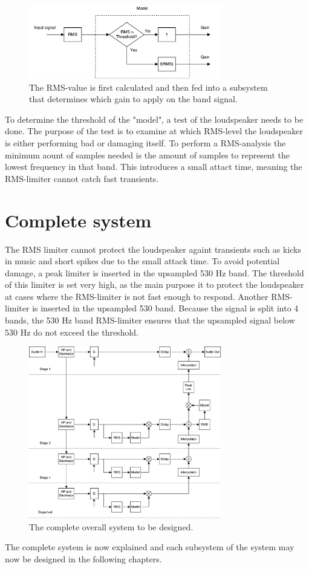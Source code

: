 \begin{figure}[H]
\centering
\includegraphics[width=0.75\textwidth]{figures/designRealRMS.pdf}
\caption{The RMS-value is first calculated and then fed into a subsystem that determines which gain to apply on the band signal.}
\label{fig:designRealRMS}
\end{figure}

To determine the threshold of the "model", a test of the loudspeaker needs to be done. The purpose of the test is to examine at which RMS-level the loudspeaker is either performing bad or damaging itself. To perform a RMS-analysis the minimum aount of samples needed is the amount of samples to represent the lowest frequency in that band. This introduces a small attact time, meaning the RMS-limiter cannot catch fast transients.



\section{Complete system}

The RMS limiter cannot protect the loudspeaker againt transients such as kicks in music and short spikes due to the small attack time. To avoid potential damage, a peak limiter is inserted in the upsampled 530 Hz band. The threshold of this limiter is set very high, as the main purpose it to protect the loudspeaker at cases where the RMS-limiter is not fast enough to respond. Another RMS-limiter is inserted in the upsampled 530 band. Because the signal is split into 4 bands, the 530 Hz band RMS-limiter ensures that the upsampled signal below 530 Hz do not exceed the threshold.

\begin{figure}[H]
\centering
\includegraphics[width=0.75\textwidth]{figures/designRealFull.pdf}
\caption{The complete overall system to be designed.}
\label{fig:designRealBlock}
\end{figure}

The complete system is now explained and each subsystem of the system may now be designed in the following chapters.
